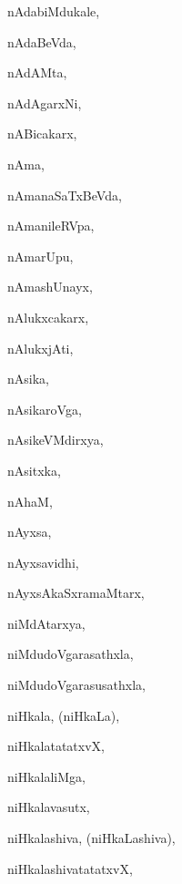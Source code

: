 \begin{multicols}{3}
{\noindent
{nAdabiMdukale}, \pageref{nAdabiMdukale}

\noindent
{nAdaBeVda}, \pageref{nAdaBeVda}

\noindent
{nAdAMta}, \pageref{nAdAMta}

\noindent
{nAdAgarxNi}, \pageref{nAdAgarxNi}

\noindent
{nABicakarx}, \pageref{nABicakarx}

\noindent
{nAma}, \pageref{nAma}

\noindent
{nAmanaSaTxBeVda}, \pageref{nAmanaSaTxBeVda}

\noindent
{nAmanileRVpa}, \pageref{nAmanileRVpa}

\noindent
{nAmarUpu}, \pageref{nAmarUpu}

\noindent
{nAmashUnayx}, \pageref{nAmashUnayx}

\noindent
{nAlukxcakarx}, \pageref{nAlukxcakarx}

\noindent
{nAlukxjAti}, \pageref{nAlukxjAti}

\noindent
{nAsika}, \pageref{nAsika}

\noindent
{nAsikaroVga}, \pageref{nAsikaroVga}

\noindent
{nAsikeVMdirxya}, \pageref{nAsikeVMdirxya}

\noindent
{nAsitxka}, \pageref{nAsitxka}

\noindent
{nAhaM}, \pageref{nAhaM}

\noindent
{nAyxsa}, \pageref{nAyxsa}

\noindent
{nAyxsavidhi}, \pageref{nAyxsavidhi}

\noindent
{nAyxsAkaSxramaMtarx}, \pageref{nAyxsAkaSxramaMtarx}

\noindent
{niMdAtarxya}, \pageref{niMdAtarxya}

\noindent
{niMdudoVgarasathxla}, \pageref{niMdudoVgarasathxla}

\noindent
{niMdudoVgarasusathxla}, \pageref{niMdudoVgarasusathxla}

\noindent
{niHkala, (niHkaLa)}, \pageref{niHkala,niHkaLa}

\noindent
{niHkalatatatxvX}, \pageref{niHkalatatatxvX}

\noindent
{niHkalaliMga}, \pageref{niHkalaliMga}

\noindent
{niHkalavasutx}, \pageref{niHkalavasutx}

\noindent
{niHkalashiva, (niHkaLashiva)}, \pageref{niHkalashiva,niHkaLashiva}

\noindent
{niHkalashivatatatxvX}, \pageref{niHkalashivatatatxvX}

}
\end{multicols}
